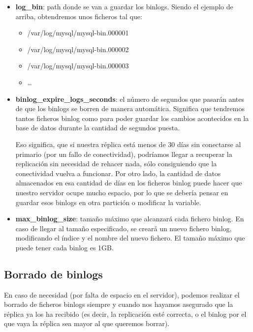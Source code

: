 \begin{itemize}
    \item \textbf{log\_bin}: path donde se van a guardar los binlogs. Siendo el ejemplo de arriba, obtendremos unos ficheros tal que:
    \begin{itemize}
        \item /var/log/mysql/mysql-bin.000001
        \item /var/log/mysql/mysql-bin.000002
        \item /var/log/mysql/mysql-bin.000003
        \item …
    \end{itemize}
    \item \textbf{binlog\_expire\_logs\_seconds}: el número de segundos que pasarán antes de que los binlogs se borren de manera automática. Significa que tendremos tantos ficheros binlog como para poder guardar los cambios acontecidos en la base de datos durante la cantidad de segundos puesta.

    Eso significa, que si nuestra réplica está menos de 30 días sin conectarse al primario (por un fallo de conectividad), podríamos llegar a recuperar la replicación sin necesidad de rehacer nada, sólo consiguiendo que la conectividad vuelva a funcionar. Por otro lado, la cantidad de datos almacenados en esa cantidad de días en los ficheros binlog puede hacer que nuestro servidor ocupe mucho espacio, por lo que se debería pensar en guardar esos binlogs en otra partición o modificar la variable.

    \item \textbf{max\_binlog\_size}: tamaño máximo que alcanzará cada fichero binlog. En caso de llegar al tamaño especificado, se creará un nuevo fichero binlog, modificando el índice y el nombre del nuevo fichero. El tamaño máximo que puede tener cada binlog es 1GB.
\end{itemize}


\subsection{Borrado de binlogs}
En caso de necesidad (por falta de espacio en el servidor), podemos realizar el borrado de ficheros binlogs siempre y cuando nos hayamos asegurado que la réplica ya los ha recibido (es decir, la replicación esté correcta, o el binlog por el que vaya la réplica sea mayor al que queremos borrar).


